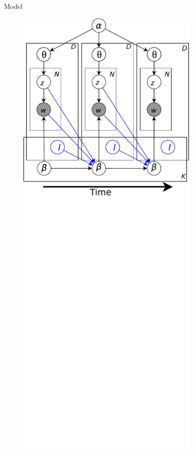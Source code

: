 \documentclass[final,t]{beamer}
\begin{document}
\begin{frame}{}
\begin{columns}[t]
\begin{column}{.29\linewidth}
\begin{block}{Model}
\begin{figure}
\includegraphics[width=0.8\textwidth]{../figures/docinf_gm.pdf}
\vspace{-27cm}

\end{figure}
\end{block}
\end{column}
\end{columns}
\end{frame}
\end{document}

